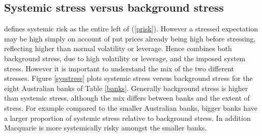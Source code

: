 \documentclass[12pt]{article}
\newcommand{\E}{\mathrm{E}}
\newcommand{\Es}{\E_\phi}
\newcommand{\eref}[1]{(\ref{#1})}
\newcommand{\fref}[1]{Figure \ref{#1}}
\newcommand{\tref}[1]{Table \ref{#1}}
\begin{document}

\subsection{Systemic stress versus background stress}

\cite{brownlees2015} defines systemic risk as the entire left of \eref{prisk}. However a stressed expectation may be high simply on account of put prices already being high before stressing, reflecting higher than normal volatility or leverage. Hence \cite{brownlees2015} combines both background stress, due to high volatility or leverage, and the imposed system stress. However it is important to understand the mix of the two different stresses. \fref{sysstress} plots systemic stress versus background stress for the eight Australian banks of \tref{banks}.   Generally background stress is higher than systemic stress, although the mix differs between banks and the extent of stress. For example compared to the smaller Australian banks, bigger banks have a larger proportion of systemic stress relative to background stress. In addition Macquarie is more systemically risky amongst the smaller banks.

\end{document}
